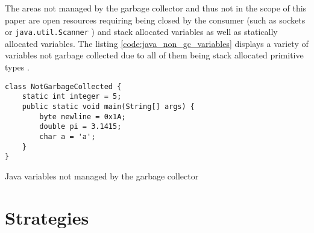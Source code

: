 The areas not managed by the garbage collector and thus not in the scope of
this paper are open resources requiring being closed by the consumer (such as
sockets or \texttt{java.util.Scanner} \cite[close]{java-util-scanner}) and
stack allocated variables as well as statically allocated variables. The
listing \autoref{code:java_non_gc_variables} displays a variety of variables
not garbage collected due to all of them being stack allocated primitive types
\cite[4.2. Primitive Types and Values]{java_language_spec_2023}.

\begin{listing}[H] 
    \begin{verbatim} 
class NotGarbageCollected {
    static int integer = 5;
    public static void main(String[] args) {
        byte newline = 0x1A;
        double pi = 3.1415;
        char a = 'a';
    }
}
    \end{verbatim}
    \caption{Java variables not managed by the garbage collector}
    \label{code:java_non_gc_variables}
\end{listing}

\section{Strategies}
